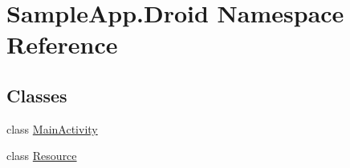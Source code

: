 \hypertarget{namespace_sample_app_1_1_droid}{}\section{Sample\+App.\+Droid Namespace Reference}
\label{namespace_sample_app_1_1_droid}
\subsection*{Classes}
\begin{DoxyCompactItemize}
\item 
class \hyperlink{class_sample_app_1_1_droid_1_1_main_activity}{Main\+Activity}
\item 
class \hyperlink{class_sample_app_1_1_droid_1_1_resource}{Resource}
\end{DoxyCompactItemize}
